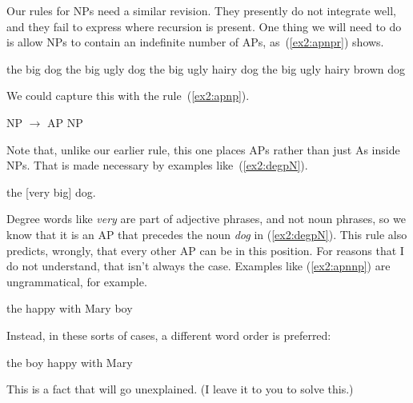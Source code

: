 Our rules for NPs need a similar revision. They presently do not integrate well, and they fail to express where recursion is present. One thing we will need to do is allow NPs to contain an indefinite number of APs, as~(\ref{ex2:apnpr}) shows.
\begin{exe}
	\raggedright
	\ex \label{ex2:apnpr} 
	\begin{xlist}
		\ex the big dog
		\ex the big ugly dog
		\ex the big ugly hairy dog
		\ex the big ugly hairy brown dog
	\end{xlist}
\end{exe}
We could capture this with the rule~(\ref{ex2:apnp}).
\begin{exe}
	\raggedright
	\ex \label{ex2:apnp} 
	NP $\rightarrow$ AP NP
\end{exe}
Note that, unlike our earlier rule, this one places APs rather than just As inside NPs. That is made necessary by examples like~(\ref{ex2:degpN}).
\begin{exe}
	\raggedright
	\ex \label{ex2:degpN} 
	the [\AP very big] dog.
\end{exe}
Degree words like \emph{very} are part of adjective phrases, and not noun phrases, so we know that it is an AP that precedes the noun \emph{dog} in (\ref{ex2:degpN}). This rule also predicts, wrongly, that every other AP can be in this position. For reasons that I do not understand, that isn't always the case. Examples like (\ref{ex2:apnnp}) are ungrammatical, for example.
\begin{exe}
	\raggedright
	\ex \label{ex2:apnnp} 
	the happy with Mary boy
\end{exe}
Instead, in these sorts of cases, a different word order is preferred:
\begin{exe}
	\raggedright
	\ex \label{ex2:npnap} 
	the boy happy with Mary
\end{exe}
This is a fact that will go unexplained. (I leave it to you to solve this.)

